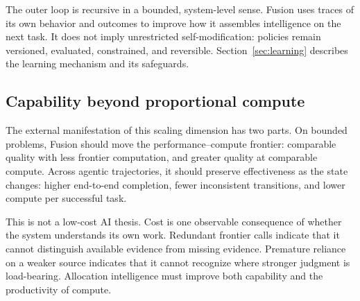The outer loop is recursive in a bounded, system-level sense. Fusion uses traces
of its own behavior and outcomes to improve how it assembles intelligence on
the next task. It does not imply unrestricted self-modification: policies
remain versioned, evaluated, constrained, and reversible.
Section~\ref{sec:learning} describes the learning mechanism and its safeguards.

\subsection{Capability beyond proportional compute}

The external manifestation of this scaling dimension has two parts. On bounded
problems, Fusion should move the performance--compute frontier: comparable
quality with less frontier computation, and greater quality at comparable
compute. Across agentic trajectories, it should preserve effectiveness as the
state changes: higher end-to-end completion, fewer inconsistent transitions,
and lower compute per successful task.

This is not a low-cost AI thesis. Cost is one observable consequence of whether
the system understands its own work. Redundant frontier calls indicate that it
cannot distinguish available evidence from missing evidence. Premature reliance
on a weaker source indicates that it cannot recognize where stronger judgment
is load-bearing. Allocation intelligence must improve both capability and the
productivity of compute.

